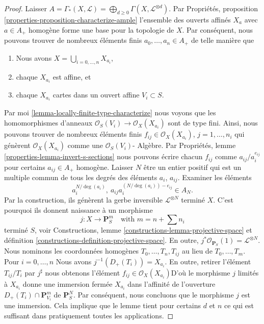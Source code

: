\begin{proof}

Laisser
$A = \Gamma_*(X, \mathcal{L}) =
\bigoplus_{d \geq 0} \Gamma(X, \mathcal{L}^{\otimes d})$. Par Propriétés, proposition \ref{properties-proposition-characterize-ample}
l'ensemble des ouverts affinés $X_a$ avec $a \in A_{+}$ homogène forme une base pour la topologie de $X$. Par conséquent, nous pouvons trouver de nombreux éléments finis $a_0, \ldots, a_n \in A_{+}$ de telle manière que

\begin{enumerate}

\item Nous avons $X = \bigcup_{i = 0, \ldots, n} X_{a_i}$,
\item chaque $X_{a_i}$ est affine, et
\item chaque $X_{a_i}$ cartes dans un ouvert affine $V_i \subset S$.

\end{enumerate}

Par moi \ref{lemma-locally-finite-type-characterize}
nous voyons que les homomorphismes d'anneaux
$\mathcal{O}_S(V_i) \to \mathcal{O}_X(X_{a_i})$ sont de type fini. Ainsi, nous pouvons trouver de nombreux éléments finis $f_{ij} \in \mathcal{O}_X(X_{a_i})$, $j = 1, \ldots, n_i$
qui génèrent $\mathcal{O}_X(X_{a_i})$ comme une $\mathcal{O}_S(V_i)$- Algèbre. Par Propriétés, lemme \ref{properties-lemma-invert-s-sections}
nous pouvons écrire chacun
$f_{ij}$ comme $a_{ij}/a_i^{e_{ij}}$ pour certains
$a_{ij} \in A_{+}$ homogène. Laisser $N$ être un entier positif qui est un multiple commun de tous les degrés des éléments
$a_i$, $a_{ij}$. Examiner les éléments
$$
a_i^{N/\deg(a_i)}, \ a_{ij}a_i^{(N/\deg(a_i)) - e_{ij}} \in A_N.
$$
Par la construction, ils génèrent la gerbe inversible
$\mathcal{L}^{\otimes N}$ terminé $X$. C'est pourquoi ils donnent naissance à un morphisme
$$
j : X \longrightarrow
\mathbf{P}_S^{m}
\quad
\text{with } m = n + \sum n_i
$$
terminé $S$, voir Constructions, lemme \ref{constructions-lemma-projective-space}
et définition \ref{constructions-definition-projective-space}. En outre, $j^*\mathcal{O}_{\mathbf{P}_S}(1) = \mathcal{L}^{\otimes N}$. Nous nominons les coordonnées homogènes $T_0, \ldots, T_n, T_{ij}$
au lieu de $T_0, \ldots, T_m$. Pour $i = 0, \ldots, n$ Nous avons $j^{-1}(D_{+}(T_i)) = X_{a_i}$. En outre, retirer l'élément $T_{ij}/T_i$ par $j^\sharp$ nous obtenons l'élément $f_{ij} \in \mathcal{O}_X(X_{a_i})$D'où le morphisme $j$ limités à $X_{a_i}$
donne une immersion fermée $X_{a_i}$ dans l'affinité de l'ouverture
$D_{+}(T_i) \cap \mathbf{P}^m_{V_i}$ de $\mathbf{P}^N_S$. Par conséquent, nous concluons que le morphisme $j$ est une immersion. Cela implique que le lemme tient pour certains $d$ et $n$ ce qui est suffisant dans pratiquement toutes les applications.


\end{proof}
